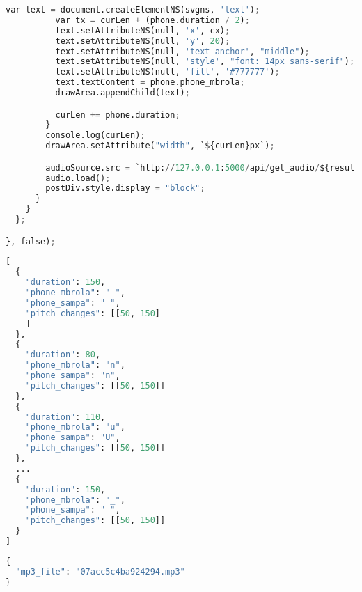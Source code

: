 \begin{lstlisting}[caption=Script para editor gráfico, label=editorjs, language=Python]
          var text = document.createElementNS(svgns, 'text');
          var tx = curLen + (phone.duration / 2);
          text.setAttributeNS(null, 'x', cx);
          text.setAttributeNS(null, 'y', 20);
          text.setAttributeNS(null, 'text-anchor', "middle");
          text.setAttributeNS(null, 'style', "font: 14px sans-serif");
          text.setAttributeNS(null, 'fill', '#777777');
          text.textContent = phone.phone_mbrola;
          drawArea.appendChild(text);

          curLen += phone.duration;
        }
        console.log(curLen);
        drawArea.setAttribute("width", `${curLen}px`);

        audioSource.src = `http://127.0.0.1:5000/api/get_audio/${results.token}`;
        audio.load();
        postDiv.style.display = "block";
      }
    }
  };

}, false);
\end{lstlisting}

\begin{lstlisting}[caption=Exemplo de resposta para \emph{endpoint} do eSpeakNG, label=espeakpost, language=Python]
[
  {
    "duration": 150,
    "phone_mbrola": "_",
    "phone_sampa": " ",
    "pitch_changes": [[50, 150]
    ]
  },
  {
    "duration": 80,
    "phone_mbrola": "n",
    "phone_sampa": "n",
    "pitch_changes": [[50, 150]]
  },
  {
    "duration": 110,
    "phone_mbrola": "u",
    "phone_sampa": "U",
    "pitch_changes": [[50, 150]]
  },
  ...
  {
    "duration": 150,
    "phone_mbrola": "_",
    "phone_sampa": " ",
    "pitch_changes": [[50, 150]]
  }
]
\end{lstlisting}

\begin{lstlisting}[caption=Exemplo de resposta para \emph{endpoint} do MBROLA, label=mbrolaget, language=Python]
{
  "mp3_file": "07acc5c4ba924294.mp3"
}
\end{lstlisting}

